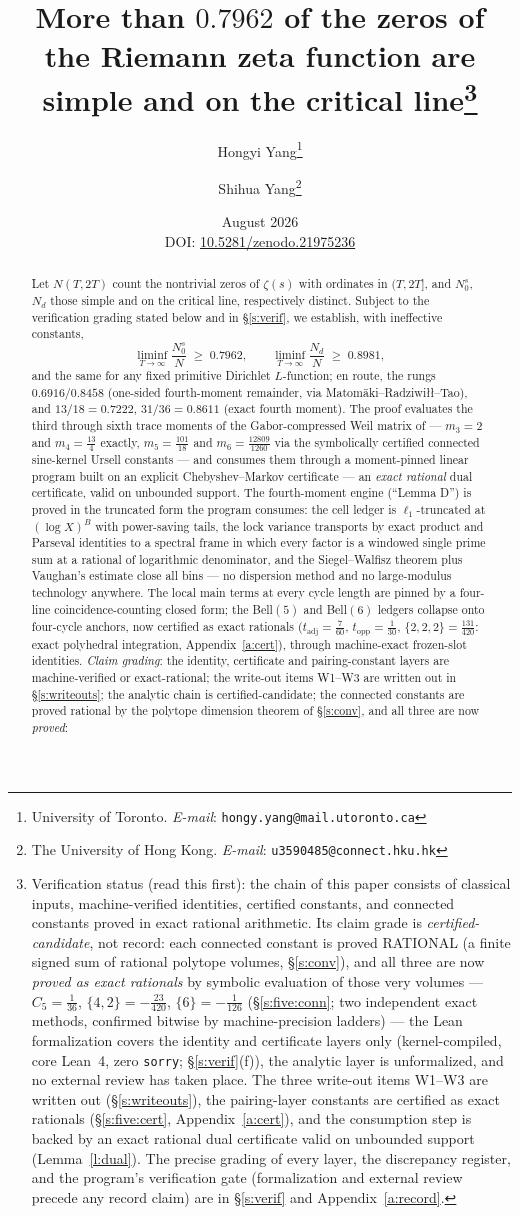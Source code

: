 \documentclass[11pt]{article}
\title{\bf More than $0.7962$ of the zeros of the Riemann zeta
function are simple and on the critical
line\thanks{Verification status (read this first): the chain of
this paper consists of classical inputs, machine-verified
identities, certified constants, and connected constants
proved in exact rational arithmetic. Its claim
grade is \emph{certified-candidate}, not record: each connected
constant is proved RATIONAL (a finite signed sum of rational
polytope volumes, \S\ref{s:conv}), and all three are now
\emph{proved as exact rationals} by symbolic evaluation of
those very volumes ---
$C_5=\tfrac1{36}$, $\{4,2\}=-\tfrac{23}{420}$,
$\{6\}=-\tfrac1{126}$ (\S\ref{s:five:conn}; two independent
exact methods, confirmed bitwise by machine-precision
ladders) --- the Lean
formalization covers the identity and certificate layers only
(kernel-compiled, core Lean~4, zero \texttt{sorry};
\S\ref{s:verif}(f)), the analytic layer is unformalized, and no
external review has taken place. The three write-out items
W1--W3 are written out (\S\ref{s:writeouts}), the pairing-layer
constants are certified as exact rationals (\S\ref{s:five:cert},
Appendix~\ref{a:cert}), and the consumption step is backed by an
exact rational dual certificate valid on unbounded support
(Lemma~\ref{l:dual}). The precise grading of every layer, the
discrepancy register, and the program's verification gate
(formalization and external review precede any record claim) are
in \S\ref{s:verif} and Appendix~\ref{a:record}.}}
\author{Hongyi Yang\thanks{University of Toronto.
\textit{E-mail}: \texttt{hongy.yang@mail.utoronto.ca}}
\and Shihua Yang\thanks{The University of Hong Kong.
\textit{E-mail}: \texttt{u3590485@connect.hku.hk}}}
\date{August 2026\\[4pt]
\small DOI: \href{https://doi.org/10.5281/zenodo.21975236}%
{10.5281/zenodo.21975236}}
\numberwithin{equation}{section}
\theoremstyle{definition}
\theoremstyle{remark}
\begin{document}
\maketitle

\begin{abstract}
Let $N(T,2T)$ count the nontrivial zeros of $\zeta(s)$ with
ordinates in $(T,2T]$, and $N_0^{s}$, $N_d$ those simple and on
the critical line, respectively distinct. Subject to the
verification grading stated below and in \S\ref{s:verif}, we
establish, with ineffective constants,
\[
\liminf_{T\to\infty}\frac{N_0^{s}}{N}\;\ge\;0.7962,
\qquad
\liminf_{T\to\infty}\frac{N_d}{N}\;\ge\;0.8981,
\]
and the same for any fixed primitive Dirichlet $L$-function; en
route, the rungs $0.6916/0.8458$ (one-sided fourth-moment
remainder, via Matom\"aki--Radziwi\l{}\l--Tao),
and $13/18=0.7222$, $31/36=0.8611$ (exact fourth moment). The proof
evaluates
the third through sixth trace moments of the Gabor-compressed
Weil matrix of \cite{C26} --- $m_3=2$ and $m_4=\tfrac{13}4$
exactly, $m_5=\tfrac{101}{18}$ and
$m_6=\tfrac{12809}{1260}$ via the symbolically certified
connected sine-kernel Ursell constants --- and consumes them through a
moment-pinned linear program built on an explicit
Chebyshev--Markov certificate --- an
\emph{exact rational} dual certificate, valid on unbounded
support. The fourth-moment engine (``Lemma D'') is proved in the
truncated form the program consumes: the cell ledger is
$\ell_1$-truncated at $(\log X)^{B}$ with power-saving tails, the
lock variance transports by exact product and Parseval identities
to a spectral frame in which every factor is a windowed single
prime sum at a rational of logarithmic denominator, and the
Siegel--Walfisz theorem plus Vaughan's estimate close all bins
--- no dispersion method and no large-modulus technology
anywhere. The local main terms at every cycle length are pinned
by a four-line coincidence-counting closed form; the Bell$(5)$
and Bell$(6)$ ledgers collapse onto four-cycle anchors, now
certified as exact rationals ($t_{\mathrm{adj}}=\tfrac7{60}$,
$t_{\mathrm{opp}}=\tfrac1{30}$,
$\{2,2,2\}=\tfrac{131}{420}$: exact polyhedral integration,
Appendix~\ref{a:cert}), through machine-exact frozen-slot
identities. \emph{Claim grading}: the identity, certificate and
pairing-constant layers are machine-verified or exact-rational;
the write-out items W1--W3
are written out in \S\ref{s:writeouts}; the analytic chain is
certified-candidate; the connected constants are proved
rational by the polytope dimension theorem of \S\ref{s:conv},
and all three are now \emph{proved}:

\end{abstract}
\end{document}
